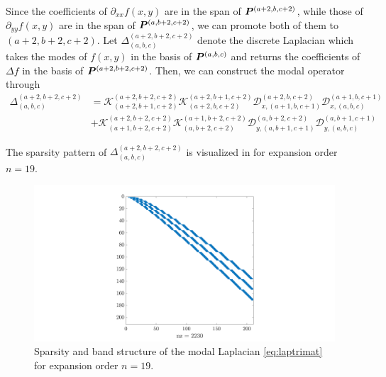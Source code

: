 Since the coefficients of $\partial_{xx}f(x,y)$ are in the span of $\boldsymbol{P}^{(a+2,b,c+2)}$, while those of $\partial_{yy}f(x,y)$ are in the span of $\boldsymbol{P}^{(a,b+2,c+2)}$, we can promote both of them to $(a+2,b+2,c+2)$. Let $\Delta_{(a,b,c)}^{(a+2,b+2,c+2)}$ denote the discrete Laplacian which takes the modes of $f(x,y)$ in the basis of $\boldsymbol{P}^{(a,b,c)}$ and returns the coefficients of $\Delta f$ in the basis of $\boldsymbol{P}^{(a+2,b+2,c+2)}$. Then, we can construct the modal operator through
\begin{equation}\label{eq:laptrimat}
	\begin{split}
	\Delta_{(a,b,c)}^{(a+2,b+2,c+2)} &= \mathcal{K}_{(a+2,b+1,c+2)}^{(a+2,b+2,c+2)}\mathcal{K}_{(a+2,b,c+2)}^{(a+2,b+1,c+2)}\mathcal{D}_{x,(a+1,b,c+1)}^{(a+2,b,c+2)}\mathcal{D}_{x,(a,b,c)}^{(a+1,b,c+1)}\\
	&+\mathcal{K}_{(a+1,b+2,c+2)}^{(a+2,b+2,c+2)}\mathcal{K}_{(a,b+2,c+2)}^{(a+1,b+2,c+2)}\mathcal{D}_{y,(a,b+1,c+1)}^{(a,b+2,c+2)}\mathcal{D}_{y,(a,b,c)}^{(a,b+1,c+1)}
	\end{split}
\end{equation}

The sparsity pattern of $\Delta_{(a,b,c)}^{(a+2,b+2,c+2)}$ is visualized in  for expansion order $n=19$.

\begin{figure}[H]
	\centering
	\includegraphics[width=0.75\linewidth]{./figures/lap_tri_mat}
	\caption{Sparsity and band structure of the modal Laplacian \eqref{eq:laptrimat} for expansion order $n=19$.}\label{fig:laptrimat}
\end{figure}

